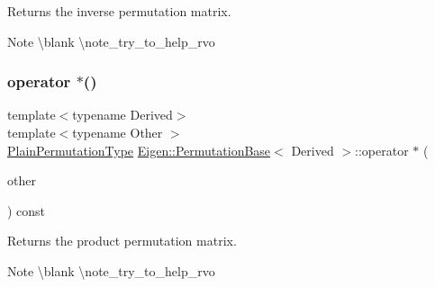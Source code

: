 \begin{DoxyReturn}{Returns}
the inverse permutation matrix.
\end{DoxyReturn}
\begin{DoxyNote}{Note}
\textbackslash{}blank \textbackslash{}note\+\_\+try\+\_\+to\+\_\+help\+\_\+rvo 
\end{DoxyNote}
\mbox{\label{class_eigen_1_1_permutation_base_a6081ae9241382cc27c32da6bb1786367}} 
\subsubsection{\texorpdfstring{operator $\ast$()}{operator *()}\hspace{0.1cm}{\footnotesize\ttfamily [1/2]}}
{\footnotesize\ttfamily template$<$typename Derived$>$ \\
template$<$typename Other $>$ \\
\mbox{\hyperlink{class_eigen_1_1_permutation_matrix}{Plain\+Permutation\+Type}} \mbox{\hyperlink{class_eigen_1_1_permutation_base}{Eigen\+::\+Permutation\+Base}}$<$ Derived $>$\+::operator $\ast$ (\begin{DoxyParamCaption}\item[{const \mbox{\hyperlink{class_eigen_1_1_permutation_base}{Permutation\+Base}}$<$ Other $>$ \&}]{other }\end{DoxyParamCaption}) const\hspace{0.3cm}{\ttfamily [inline]}}

\begin{DoxyReturn}{Returns}
the product permutation matrix.
\end{DoxyReturn}
\begin{DoxyNote}{Note}
\textbackslash{}blank \textbackslash{}note\+\_\+try\+\_\+to\+\_\+help\+\_\+rvo 
\end{DoxyNote}
\mbox{\label{class_eigen_1_1_permutation_base_a98b48bb723276fefd8ca7d7b14255ed4}} 
